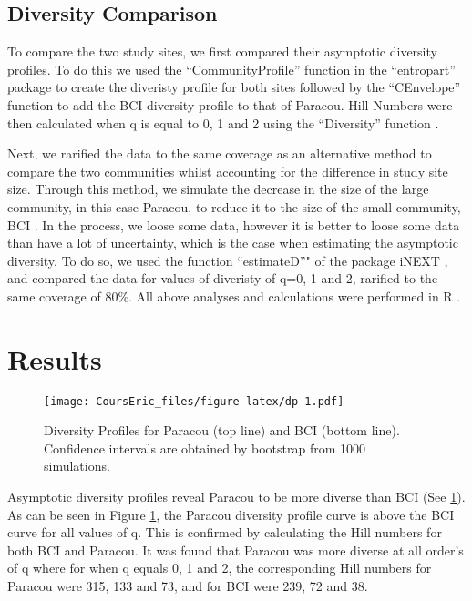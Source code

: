 \documentclass[fleqn,10pt]{ArtEcoFoG} %
\begin{document}
\subsection{Diversity Comparison}\label{diversity-comparison}

To compare the two study sites, we first compared their asymptotic
diversity profiles. To do this we used the ``CommunityProfile'' function
in the ``entropart'' package \citep{Marcon2014c} to create the diveristy
profile for both sites followed by the ``CEnvelope'' function
\citep{Marcon2014c} to add the BCI diversity profile to that of Paracou.
Hill Numbers were then calculated when q is equal to 0, 1 and 2 using
the ``Diversity'' function \citep{Marcon2014c}.

Next, we rarified the data to the same coverage as an alternative method
to compare the two communities whilst accounting for the difference in
study site size. Through this method, we simulate the decrease in the
size of the large community, in this case Paracou, to reduce it to the
size of the small community, BCI \citep{marcon2017}. In the process, we
loose some data, however it is better to loose some data than have a lot
of uncertainty, which is the case when estimating the asymptotic
diversity. To do so, we used the function ``estimateD''" of the package
iNEXT \citep{hsieh2016inext}, and compared the data for values of
diveristy of q=0, 1 and 2, rarified to the same coverage of 80\%. All
above analyses and calculations were performed in R \citep{R}.

\section{Results}\label{results}

\begin{figure}
\centering
\texttt{[image: CoursEric\_files/figure-latex/dp-1.pdf]}
\caption{\label{fig:dp}Diversity Profiles for Paracou (top line) and BCI
(bottom line). Confidence intervals are obtained by bootstrap from 1000
simulations.}
\end{figure}

Asymptotic diversity profiles reveal Paracou to be more diverse than BCI
(See \ref{fig:dp}). As can be seen in Figure \ref{fig:dp}, the Paracou
diversity profile curve is above the BCI curve for all values of q. This
is confirmed by calculating the Hill numbers for both BCI and Paracou.
It was found that Paracou was more diverse at all order's of q where for
when q equals 0, 1 and 2, the corresponding Hill numbers for Paracou
were 315, 133 and 73, and for BCI were 239, 72 and 38.
\end{document}
